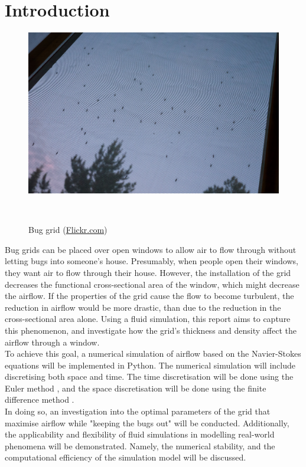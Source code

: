 \section{Introduction} \label{section: intro and motiv}

\begin{figure}
\vspace{-1.5cm}
\includegraphics[width=0.9\linewidth]{figures/mosquitogrid.jpg}
\caption{Bug grid (\href{https://www.flickr.com/photos/neekohfi/7817306994/}{Flickr.com})}\
\end{figure}

Bug grids can be placed over open windows to allow air to flow through without letting bugs into someone's house. Presumably, when people open their windows, they want air to flow through their house. However, the installation of the grid decreases the functional cross-sectional area of the window, which might decrease the airflow. If the properties of the grid cause the flow to become turbulent, the reduction in airflow would be more drastic, than due to the reduction in the cross-sectional area alone. Using a fluid simulation, this report aims to capture this phenomenon, and investigate how the grid's thickness and density affect the airflow through a window. \\

To achieve this goal, a numerical simulation of airflow based on the Navier-Stokes equations will be implemented in Python. The numerical simulation will include discretising both space and time. The time discretisation will be done using the Euler method
, and the space discretisation will be done using the finite difference method \cite{landau2015computational}. \\ 

In doing so, an investigation into the optimal parameters of the grid that maximise airflow while "keeping the bugs out" will be conducted. Additionally, the applicability and flexibility of fluid simulations in modelling real-world phenomena will be demonstrated. Namely, the numerical stability, and the computational efficiency of the simulation model will be discussed. \\


